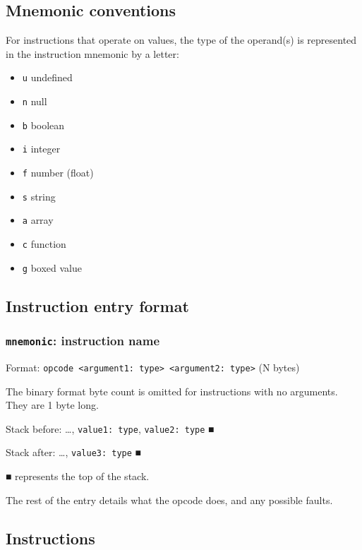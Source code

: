 \subsection{Mnemonic conventions}
\label{sec:org6c2c333}
For instructions that operate on values, the type of the operand(s) is
represented in the instruction mnemonic by a letter:

\begin{itemize}
\item \texttt{u} undefined

\item \texttt{n} null

\item \texttt{b} boolean

\item \texttt{i} integer

\item \texttt{f} number (float)

\item \texttt{s} string

\item \texttt{a} array

\item \texttt{c} function

\item \texttt{g} boxed value
\end{itemize}

\subsection{Instruction entry format}
\label{sec:org6af44d0}
\subsubsection{\texttt{mnemonic}: instruction name}
\label{sec:org91c15ea}
Format: \texttt{opcode <argument1: type> <argument2: type>} (N bytes)

The binary format byte count is omitted for instructions with no
arguments. They are 1 byte long.

Stack before: \ldots{}​, \texttt{value1: type}, \texttt{value2: type} ■

Stack after: \ldots{}​, \texttt{value3: type} ■

■ represents the top of the stack.

The rest of the entry details what the opcode does, and any possible
faults.

\subsection{Instructions}
\label{sec:org33d7595}
